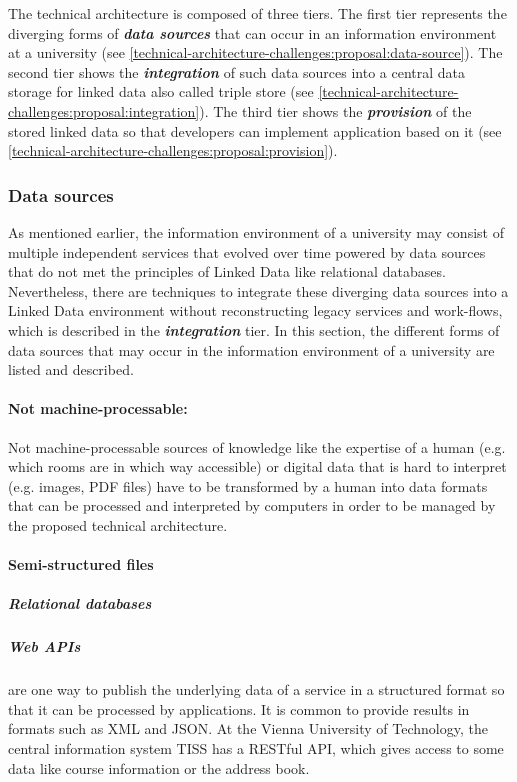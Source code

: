 \documentclass{article}
\begin{document}
The technical architecture is composed of three tiers. The first tier represents the diverging forms of \textbf{\textit{data sources}} that can occur in an information environment at a university (see \ref{technical-architecture-challenges:proposal:data-source}). The second tier shows the \textbf{\textit{integration}} of such data sources into a central data storage for linked data also called triple store (see \ref{technical-architecture-challenges:proposal:integration}). The third tier shows the \textbf{\textit{provision}} of the stored linked data so that developers can implement application based on it (see \ref{technical-architecture-challenges:proposal:provision}). 

\subsubsection{Data sources}
As mentioned earlier, the information environment of a university may consist of multiple independent services that evolved over time powered by data sources that do not met the principles of Linked Data like relational databases.  Nevertheless, there are techniques to integrate these diverging data sources into a Linked Data environment without reconstructing legacy services and work-flows, which is described in the \textbf{\textit{integration}} tier. In this section, the different forms of data sources that may occur in the information environment of a university are listed and described.

\label{technical-architecture-challenges:proposal:data-source}

\paragraph{Not machine-processable:} Not machine-processable sources of knowledge like the expertise of a human (e.g. which rooms are in which way accessible) or digital data that is hard to interpret (e.g. images, PDF files) have to be transformed by a human into data formats that can be processed and interpreted by computers in order to be managed by the proposed technical architecture.

\paragraph{Semi-structured files} 

\subparagraph{Relational databases}

\subparagraph{Web APIs} are one way to publish the underlying data of a service in a structured format so that it can be processed by applications. It is common to provide results in formats such as XML and JSON. At the Vienna University of Technology, the central information system TISS has a RESTful API, which gives access to some data like course information or the address book.
\end{document}
